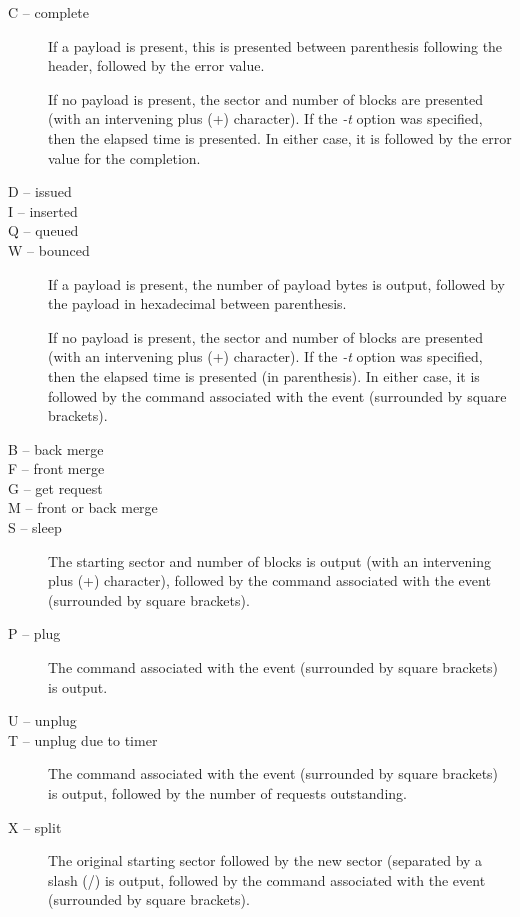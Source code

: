 \documentclass{article}
\begin{document}
\begin{description}
  \item[C -- complete] If a payload is present, this is presented between
  parenthesis following the header, followed by the error value. 

  If no payload is present, the sector and number of blocks are presented
  (with an intervening plus (+) character). If the \emph{-t} option
  was specified, then the elapsed time is presented. In either case,
  it is followed by the error value for the completion.

  \item[D -- issued]
  \item[I -- inserted]
  \item[Q -- queued]
  \item[W -- bounced] If a payload is present, the number of payload bytes
  is output, followed by the payload in hexadecimal between parenthesis.

  If no payload is present, the sector and number of blocks are presented
  (with an intervening plus (+) character). If the \emph{-t} option was
  specified, then the elapsed time is presented (in parenthesis). In
  either case, it is followed by the command associated with the event
  (surrounded by square brackets).

  \item[B -- back merge]
  \item[F -- front merge]
  \item[G -- get request]
  \item[M -- front or back merge]
  \item[S -- sleep] The starting sector and number of blocks is output
  (with an intervening plus (+) character), followed by the command
  associated with the event (surrounded by square brackets).

  \item[P -- plug] The command associated with the event (surrounded by
  square brackets) is output.

  \item[U -- unplug]
  \item[T -- unplug due to timer] The command associated with the event
  (surrounded by square brackets) is output, followed by the number of
  requests outstanding.

  \item[X -- split] The original starting sector followed by the new
  sector (separated by a slash (/) is output, followed by the command
  associated with the event (surrounded by square brackets).

\end{description}
\end{document}
